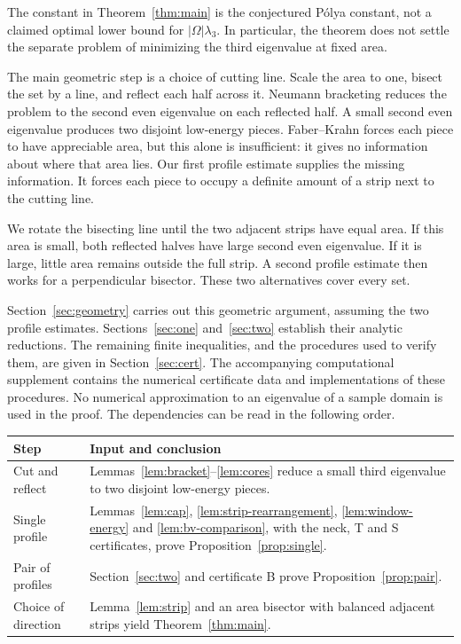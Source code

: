 The constant in Theorem~\ref{thm:main} is the conjectured P\'olya constant, not a claimed optimal lower bound for $|\Omega|\lambda_3$. In particular, the theorem does not settle the separate problem of minimizing the third eigenvalue at fixed area.

The main geometric step is a choice of cutting line. Scale the area to one, bisect the set by a line, and reflect each half across it. Neumann bracketing reduces the problem to the second even eigenvalue on each reflected half. A small second even eigenvalue produces two disjoint low-energy pieces. Faber--Krahn forces each piece to have appreciable area, but this alone is insufficient: it gives no information about where that area lies. Our first profile estimate supplies the missing information. It forces each piece to occupy a definite amount of a strip next to the cutting line.

We rotate the bisecting line until the two adjacent strips have equal area. If this area is small, both reflected halves have large second even eigenvalue. If it is large, little area remains outside the full strip. A second profile estimate then works for a perpendicular bisector. These two alternatives cover every set.

Section~\ref{sec:geometry} carries out this geometric argument, assuming the two profile estimates. Sections~\ref{sec:one} and~\ref{sec:two} establish their analytic reductions. The remaining finite inequalities, and the procedures used to verify them, are given in Section~\ref{sec:cert}. The accompanying computational supplement contains the numerical certificate data and implementations of these procedures. No numerical approximation to an eigenvalue of a sample domain is used in the proof.
The dependencies can be read in the following order.
\begin{center}
\begin{tabular}{>{\raggedright\arraybackslash}p{}>{\raggedright\arraybackslash}p{}}\toprule
Step & Input and conclusion\\\midrule
Cut and reflect & Lemmas~\ref{lem:bracket}--\ref{lem:cores} reduce a small third eigenvalue to two disjoint low-energy pieces.\\
Single profile & Lemmas~\ref{lem:cap}, \ref{lem:strip-rearrangement}, \ref{lem:window-energy} and \ref{lem:bv-comparison}, with the neck, T and S certificates, prove Proposition~\ref{prop:single}.\\
Pair of profiles & Section~\ref{sec:two} and certificate B prove Proposition~\ref{prop:pair}.\\
Choice of direction & Lemma~\ref{lem:strip} and an area bisector with balanced adjacent strips yield Theorem~\ref{thm:main}.\\\bottomrule
\end{tabular}
\end{center}


